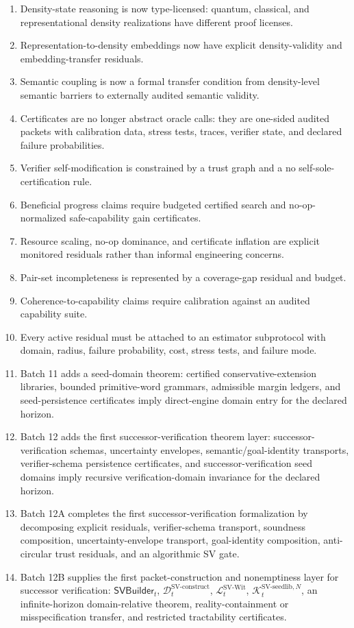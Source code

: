 \documentclass[11pt]{article}
\newcommand{\Lcal}{\mathcal{L}}
\newcommand{\1}{\mathbf{1}}
\providecommand{\Dcal}{\mathcal{D}}
\providecommand{\Kcal}{\mathcal{K}}
\begin{document}
\begin{enumerate}[label=(\arabic*)]
    \item Density-state reasoning is now type-licensed: quantum, classical, and representational density realizations have different proof licenses.
    \item Representation-to-density embeddings now have explicit density-validity and embedding-transfer residuals.
    \item Semantic coupling is now a formal transfer condition from density-level semantic barriers to externally audited semantic validity.
    \item Certificates are no longer abstract oracle calls: they are one-sided audited packets with calibration data, stress tests, traces, verifier state, and declared failure probabilities.
    \item Verifier self-modification is constrained by a trust graph and a no self-sole-certification rule.
    \item Beneficial progress claims require budgeted certified search and no-op-normalized safe-capability gain certificates.
    \item Resource scaling, no-op dominance, and certificate inflation are explicit monitored residuals rather than informal engineering concerns.
    \item Pair-set incompleteness is represented by a coverage-gap residual and budget.
    \item Coherence-to-capability claims require calibration against an audited capability suite.
    \item Every active residual must be attached to an estimator subprotocol with domain, radius, failure probability, cost, stress tests, and failure mode.
    \item Batch 11 adds a seed-domain theorem: certified conservative-extension libraries, bounded primitive-word grammars, admissible margin ledgers, and seed-persistence certificates imply direct-engine domain entry for the declared horizon.
    \item Batch 12 adds the first successor-verification theorem layer: successor-verification schemas, uncertainty envelopes, semantic/goal-identity transports, verifier-schema persistence certificates, and successor-verification seed domains imply recursive verification-domain invariance for the declared horizon.
    \item Batch 12A completes the first successor-verification formalization by decomposing explicit residuals, verifier-schema transport, soundness composition, uncertainty-envelope transport, goal-identity composition, anti-circular trust residuals, and an algorithmic SV gate.
    \item Batch 12B supplies the first packet-construction and nonemptiness layer for successor verification: \(\mathsf{SVBuilder}_t\), \(\Dcal_t^{\mathrm{SV\mbox{-}construct}}\), \(\Lcal_t^{\mathrm{SV\mbox{-}Wit}}\), \(\Kcal_t^{\mathrm{SV\mbox{-}seedlib},N}\), an infinite-horizon domain-relative theorem, reality-containment or misspecification transfer, and restricted tractability certificates.
\end{enumerate}
\end{document}

